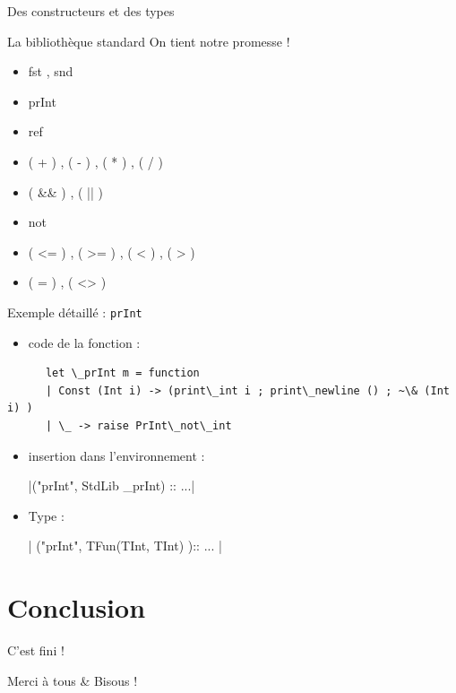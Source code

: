\documentclass{beamer}
\begin{document}
\begin{frame}{Des constructeurs et des types}
  
\end{frame}



\begin{frame}{La bibliothèque standard}
  On tient notre promesse !

  \begin{itemize}
  \item fst , snd
  \item prInt
  \item ref
  \item ( + ) , ( - ) , ( * ) , ( / )
  \item ( \&\& ) ,  ( || )
  \item not
  \item ( <= ) , ( >= ) , ( < ) , ( > )
  \item ( = ) , ( <> )
  \end{itemize}
\end{frame}

\begin{frame}{Exemple détaillé : \texttt{prInt}}
  \begin{itemize}
  \item code de la fonction :
  \end{itemize}

    \begin{verbatim}
      let \_prInt m = function
      | Const (Int i) -> (print\_int i ; print\_newline () ; ~\& (Int i) )
      | \_ -> raise PrInt\_not\_int
    \end{verbatim}

  \begin{itemize}
  \item insertion dans l'environnement :

    |("prInt", StdLib _prInt) :: ...|

  \item Type :

    | ("prInt", TFun(TInt, TInt) ):: ... |


  \end{itemize}
  \end{frame}

\section{Conclusion}
\begin{frame}{C'est fini !}
  \begin{center}
    \Huge Merci à tous \& Bisous !
  \end{center}
\end{frame}
\end{document}
